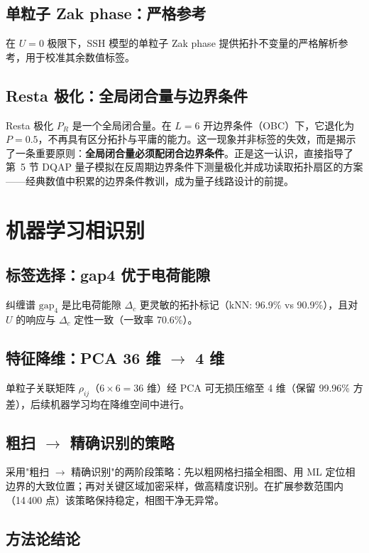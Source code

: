 \documentclass[11pt,a4paper]{article}
\begin{document}
\subsection{单粒子 Zak phase：严格参考}

在 $U=0$ 极限下，SSH 模型的单粒子 Zak phase 提供拓扑不变量的严格解析参考，用于校准其余数值标签。

\subsection{Resta 极化：全局闭合量与边界条件}

Resta 极化 $P_R$ 是一个全局闭合量。在 $L=6$ 开边界条件（OBC）下，它退化为 $P=0.5$，不再具有区分拓扑与平庸的能力。这一现象并非标签的失效，而是揭示了一条重要原则：\textbf{全局闭合量必须配闭合边界条件}。正是这一认识，直接指导了第~5 节 DQAP 量子模拟在反周期边界条件下测量极化并成功读取拓扑扇区的方案——经典数值中积累的边界条件教训，成为量子线路设计的前提。

\section{机器学习相识别}

\subsection{标签选择：gap4 优于电荷能隙}

纠缠谱 $\mathrm{gap}_4$ 是比电荷能隙 $\Delta_c$ 更灵敏的拓扑标记（kNN: 96.9\% vs 90.9\%），且对 $U$ 的响应与 $\Delta_c$ 定性一致（一致率 70.6\%）。

\subsection{特征降维：PCA 36 维 $\to$ 4 维}

单粒子关联矩阵 $\rho_{ij}$（$6\times6=36$ 维）经 PCA 可无损压缩至 4 维（保留 99.96\% 方差），后续机器学习均在降维空间中进行。

\subsection{粗扫 $\to$ 精确识别的策略}

采用"粗扫 $\to$ 精确识别"的两阶段策略：先以粗网格扫描全相图、用 ML 定位相边界的大致位置；再对关键区域加密采样，做高精度识别。在扩展参数范围内（14\,400 点）该策略保持稳定，相图干净无异常。

\subsection{方法论结论}
\end{document}
